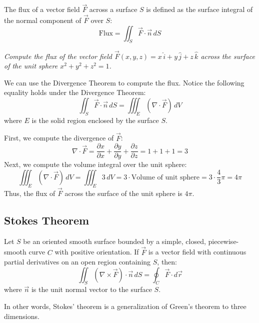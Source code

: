 \documentclass[11pt]{report}
\begin{document}
\begin{definition}[Flux]
    The flux of a vector field \(\vec{F}\) across a surface \(S\) is defined as the surface integral of the normal component of \(\vec{F}\) over \(S\):
    \begin{equation}
        \text{Flux} = \iint_S \vec{F} \cdot \vec{n} \, dS
    \end{equation}
\end{definition}
\begin{example}[Flux]
\textit{Compute the flux of the vector field \(\vec{F}(x,y,z) = x \, \hat{i} + y \, \hat{j} + z \, \hat{k}\) across the surface of the unit sphere \(x^2 + y^2 + z^2 = 1\).}

We can use the Divergence Theorem to compute the flux. Notice the following equality holds under the Divergence Theorem:
\[\iint_S \vec{F} \cdot \vec{n} \, dS = \iiint_E (\nabla \cdot \vec{F}) \, dV\]
where \(E\) is the solid region enclosed by the surface \(S\).

First, we compute the divergence of \(\vec{F}\):
\[
\nabla \cdot \vec{F} = \frac{\partial x}{\partial x} + \frac{\partial y}{\partial y} + \frac{\partial z}{\partial z} = 1 + 1 + 1 = 3
\]
Next, we compute the volume integral over the unit sphere:
\[
\iiint_E (\nabla \cdot \vec{F}) \, dV = \iiint_E 3 \, dV = 3 \cdot \text{Volume of unit sphere} = 3 \cdot \frac{4}{3} \pi = 4\pi
\]
Thus, the flux of \(\vec{F}\) across the surface of the unit sphere is \(4\pi\).

\end{example}
\subsection{Stokes Theorem}
\begin{theorem}
    Let \(S\) be an oriented smooth surface bounded by a simple, closed, piecewise-smooth curve \(C\) with positive orientation. If \(\vec{F}\) is a vector field with continuous partial derivatives on an open region containing \(S\), then:
    \begin{equation}
        \iint_S (\nabla \times \vec{F}) \cdot \vec{n} \, dS = \oint_C \vec{F} \cdot d\vec{r}
    \end{equation}
    where \(\vec{n}\) is the unit normal vector to the surface \(S\).

    In other words, Stokes' theorem is a generalization of Green's theorem to three dimensions.
\end{theorem}
\end{document}
